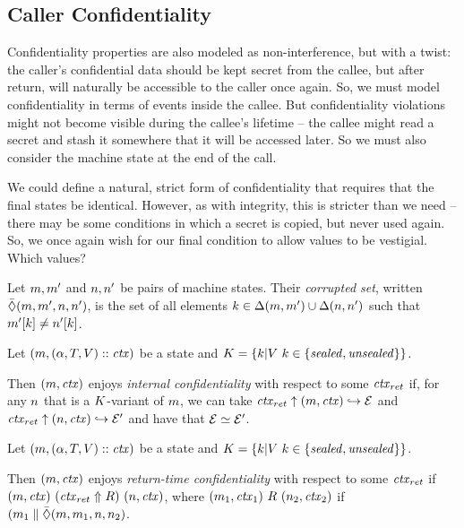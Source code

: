 \documentclass[10pt,conference]{ieeetran}%
\theoremstyle{definition}
\begin{document}
\subsection{Caller Confidentiality}

Confidentiality properties are also modeled as non-interference, but with a twist:
the caller's confidential data should be kept secret from the callee, but after return,
will naturally be accessible to the caller once again. So, we must model confidentiality
in terms of events inside the callee. But confidentiality violations might not become
visible during the callee's lifetime -- the callee might read a secret and stash it somewhere
that it will be accessed later. So we must also consider the machine state at the end
of the call.

We could define a natural, strict form of confidentiality that requires that the final
states be identical. However, as with integrity, this is stricter than we need -- there
may be some conditions in which a secret is copied, but never used again. So, we once
again wish for our final condition to allow values to be vestigial. Which values?

 Let \(m,m'\) and \(n,n'\)
be pairs of machine states. Their {\em corrupted set}, written
\(\bar{\Diamond}(m,m',n,n')\), is the set of all elements
\(k \in \Delta(m,m') \cup \Delta(n,n')\) such that
\(m'[k] \not = n'[k]\).

 Let \((m,(\alpha,T,V)::\mathit{ctx})\) be a state and
\(K = \{k | V ~ k \in \{\mathit{sealed}, \mathit{unsealed}\}\}\).

Then \((m,\mathit{ctx})\) enjoys {\it internal confidentiality} with respect to
some \(\mathit{ctx}_{ret}\) if, for any \(n\)
that is a \(K\)-variant of \(m\), we can take
\(\mathit{ctx}_{ret} \uparrow (m,\mathit{ctx}) \hookrightarrow \mathcal{E}\) and
\(\mathit{ctx}_{ret} \uparrow (n,\mathit{ctx}) \hookrightarrow \mathcal{E}'\) and have that
\(\mathcal{E} \simeq \mathcal{E}'\).

 Let \((m,(\alpha,T,V)::\mathit{ctx})\) be a state and
\(K = \{k | V ~ k \in \{\mathit{sealed}, \mathit{unsealed}\}\}\).

Then \((m,\mathit{ctx})\) enjoys {\it return-time confidentiality} with respect to
some \(\mathit{ctx}_{ret}\) if \((m,\mathit{ctx}) ~ (\mathit{ctx}_{ret} \Uparrow R) ~ (n,\mathit{ctx})\),
where \((m_1,\mathit{ctx}_1) ~ R ~ (n_2,\mathit{ctx}_2)\) if
\((m_1 \parallel \bar{\Diamond}(m,m_1,n,n_2)\).
\end{document}
